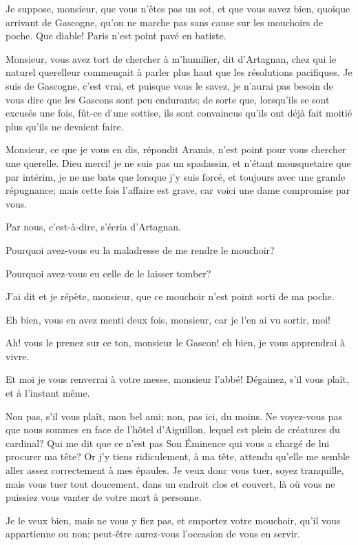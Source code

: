\speak  Je suppose, monsieur, que vous n'êtes pas un sot, et que vous savez bien, quoique arrivant de Gascogne, qu'on ne marche pas sans cause sur les mouchoirs de poche. Que diable! Paris n'est point pavé en batiste. 

\speak  Monsieur, vous avez tort de chercher à m'humilier, dit d'Artagnan, chez qui le naturel querelleur commençait à parler plus haut que les résolutions pacifiques. Je suis de Gascogne, c'est vrai, et puisque vous le savez, je n'aurai pas besoin de vous dire que les Gascons sont peu endurants; de sorte que, lorsqu'ils se sont excusés une fois, fût-ce d'une sottise, ils sont convaincus qu'ils ont déjà fait moitié plus qu'ils ne devaient faire. 

\speak  Monsieur, ce que je vous en dis, répondit Aramis, n'est point pour vous chercher une querelle. Dieu merci! je ne suis pas un spadassin, et n'étant mousquetaire que par intérim, je ne me bats que lorsque j'y suis forcé, et toujours avec une grande répugnance; mais cette fois l'affaire est grave, car voici une dame compromise par vous. 

\speak  Par nous, c'est-à-dire, s'écria d'Artagnan. 

\speak  Pourquoi avez-vous eu la maladresse de me rendre le mouchoir? 

\speak  Pourquoi avez-vous eu celle de le laisser tomber? 

\speak  J'ai dit et je répète, monsieur, que ce mouchoir n'est point sorti de ma poche. 

\speak  Eh bien, vous en avez menti deux fois, monsieur, car je l'en ai vu sortir, moi! 

\speak  Ah! vous le prenez sur ce ton, monsieur le Gascon! eh bien, je vous apprendrai à vivre. 

\speak  Et moi je vous renverrai à votre messe, monsieur l'abbé! Dégainez, s'il vous plaît, et à l'instant même. 

\speak  Non pas, s'il vous plaît, mon bel ami; non, pas ici, du moins. Ne voyez-vous pas que nous sommes en face de l'hôtel d'Aiguillon, lequel est plein de créatures du cardinal? Qui me dit que ce n'est pas Son Éminence qui vous a chargé de lui procurer ma tête? Or j'y tiens ridiculement, à ma tête, attendu qu'elle me semble aller assez correctement à mes épaules. Je veux donc vous tuer, soyez tranquille, mais vous tuer tout doucement, dans un endroit clos et couvert, là où vous ne puissiez vous vanter de votre mort à personne. 

\speak  Je le veux bien, mais ne vous y fiez pas, et emportez votre mouchoir, qu'il vous appartienne ou non; peut-être aurez-vous l'occasion de vous en servir. 

